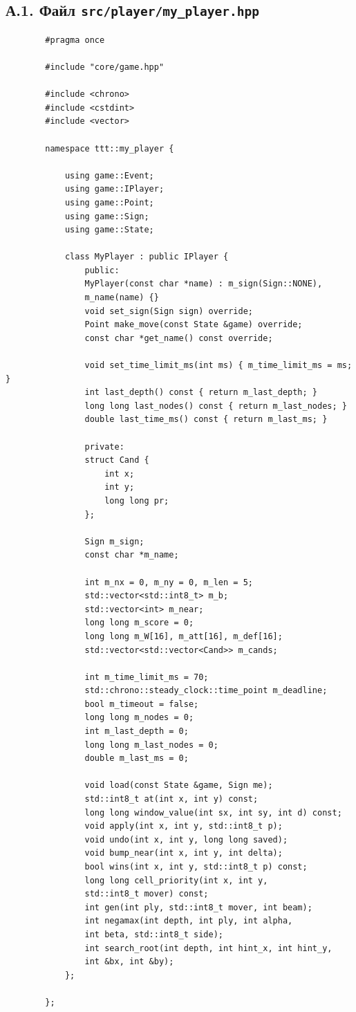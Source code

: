\documentclass[14pt,a4paper]{extarticle}
\begin{document}
	\subsection*{А.1. Файл \texttt{src/player/my\_player.hpp}}
	\begin{verbatim}
		#pragma once
		
		#include "core/game.hpp"
		
		#include <chrono>
		#include <cstdint>
		#include <vector>
		
		namespace ttt::my_player {
			
			using game::Event;
			using game::IPlayer;
			using game::Point;
			using game::Sign;
			using game::State;
			
			class MyPlayer : public IPlayer {
				public:
				MyPlayer(const char *name) : m_sign(Sign::NONE), 
				m_name(name) {}
				void set_sign(Sign sign) override;
				Point make_move(const State &game) override;
				const char *get_name() const override;
				
				void set_time_limit_ms(int ms) { m_time_limit_ms = ms; }
				int last_depth() const { return m_last_depth; }
				long long last_nodes() const { return m_last_nodes; }
				double last_time_ms() const { return m_last_ms; }
				
				private:
				struct Cand {
					int x;
					int y;
					long long pr;
				};
				
				Sign m_sign;
				const char *m_name;
				
				int m_nx = 0, m_ny = 0, m_len = 5;
				std::vector<std::int8_t> m_b;
				std::vector<int> m_near; 
				long long m_score = 0;   
				long long m_W[16], m_att[16], m_def[16];
				std::vector<std::vector<Cand>> m_cands;
				
				int m_time_limit_ms = 70;
				std::chrono::steady_clock::time_point m_deadline;
				bool m_timeout = false;
				long long m_nodes = 0;
				int m_last_depth = 0;
				long long m_last_nodes = 0;
				double m_last_ms = 0;
				
				void load(const State &game, Sign me);
				std::int8_t at(int x, int y) const;
				long long window_value(int sx, int sy, int d) const;
				void apply(int x, int y, std::int8_t p);
				void undo(int x, int y, long long saved);
				void bump_near(int x, int y, int delta);
				bool wins(int x, int y, std::int8_t p) const;
				long long cell_priority(int x, int y, 
				std::int8_t mover) const;
				int gen(int ply, std::int8_t mover, int beam);
				int negamax(int depth, int ply, int alpha, 
				int beta, std::int8_t side);
				int search_root(int depth, int hint_x, int hint_y, 
				int &bx, int &by);
			};
			
		}; 
	\end{verbatim}
	
\end{document}
